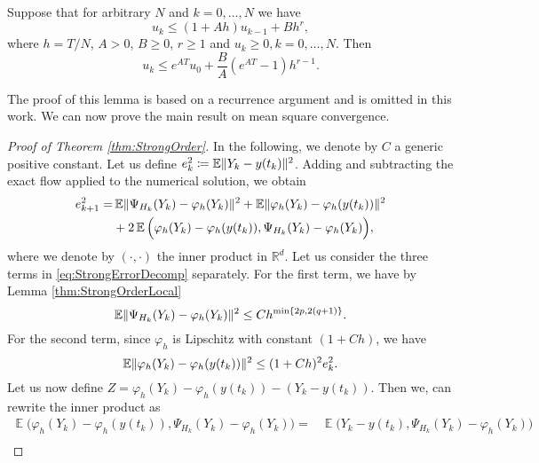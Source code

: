\documentclass{siamart1116}
\numberwithin{theorem}{section}
\DeclarePairedDelimiter{\norm}{\|}{\|}
\renewcommand{\phi}{\varphi}
\newcommand{\R}{\mathbb{R}}
\newcommand{\defeq}{\coloneqq}
\newcommand{\E}{\operatorname{\mathbb{E}}}
\begin{document}
\begin{lemma}\label{lem:RecurrenceBound} Suppose that for arbitrary $N$ and $k = 0, \ldots, N$ we have
	\begin{equation}
		u_{k} \leq (1 + Ah) u_{k-1} + Bh^r,
	\end{equation}
	where $h = T / N$, $A > 0$, $B \geq 0$, $r \geq 1$ and $u_k \geq 0, k = 0, \ldots, N$. Then
	\begin{equation}
		u_k \leq e^{AT}u_0 + \frac{B}{A}(e^{AT} - 1) h^{r-1}.
	\end{equation}
\end{lemma}
The proof of this lemma is based on a recurrence argument and is omitted in this work. We can now prove the main result on mean square convergence.
\begin{proof}[Proof of Theorem \ref{thm:StrongOrder}] In the following, we denote by $C$ a generic positive constant. Let us define $e_k^2 \defeq \E\norm{Y_k - y(t_k)}^2$. Adding and subtracting the exact flow applied to the numerical solution, we obtain
	\begin{equation}\label{eq:StrongErrorDecomp}
		\begin{aligned}
			e_{k+1}^2 = &\E\norm{\Psi_{H_k}(Y_k) - \phi_{h}(Y_k)}^2 + \E\norm{\phi_{h}(Y_k) - \phi_{h}(y(t_k))}^2 \\
					  &+ 2\E\Big(\phi_{h}(Y_k) - \phi_{h}(y(t_k)), \Psi_{H_k}(Y_k) - \phi_{h}(Y_k)\Big),
		\end{aligned}
	\end{equation}
	where we denote by $(\cdot, \cdot)$ the inner product in $\R^d$. Let us consider the three terms in \eqref{eq:StrongErrorDecomp} separately. For the first term, we have by Lemma \ref{thm:StrongOrderLocal}
	\begin{equation}\label{eq:StrongFirstTerm}
		\E\norm{\Psi_{H_k}(Y_k) - \phi_{h}(Y_k)}^2 \leq Ch^{\min\{2p, 2(q+1)\}}.
	\end{equation}
    For the second term, since $\phi_h$ is Lipschitz with constant $(1 + Ch)$, we have
	\begin{equation}\label{eq:StrongSecondTerm}
		\E\norm{\phi_{h}(Y_k) - \phi_{h}(y(t_k))}^2 \leq (1 + Ch)^2 e_k^2.
	\end{equation}
	Let us now define $Z = \phi_{h}(Y_k) - \phi_{h}(y(t_k)) - (Y_k - y(t_k))$. Then we, can rewrite the inner product as
	\begin{equation}\label{eq:StrongScalarProd}
	\begin{aligned}
		\E\Big(\phi_{h}(Y_k) - \phi_{h}(y(t_k)), \Psi_{H_k}(Y_k) - \phi_{h}(Y_k)\Big) = &\E\Big(Y_k - y(t_k), \Psi_{H_k}(Y_k) - \phi_{h}(Y_k)\Big) \\

\end{aligned}
\end{equation}
\end{proof}
\end{document}
